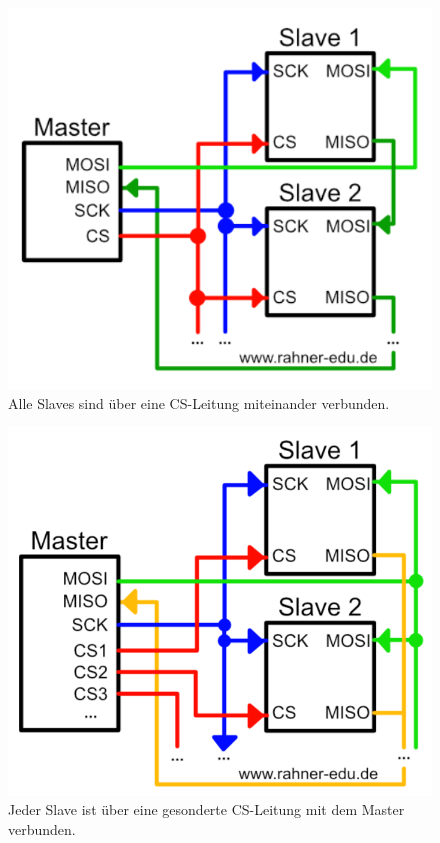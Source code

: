 \begin{figure}[H]
	\begin{center}
		\includegraphics[scale=0.45]{figures/hcis/spi_anschluss_1.png}
		\caption{Alle Slaves sind über eine CS-Leitung miteinander verbunden.}
		\label{abb:SPI_Anschluss_1}
	\end{center}
\end{figure}

\begin{figure}[H]
	\begin{center}	
		\includegraphics[scale=0.35]{figures/hcis/spi_anschluss_2.png}
		\caption{ Jeder Slave ist über eine gesonderte CS-Leitung mit dem Master verbunden.}
		\label{abb:SPI_Anschluss_2}
	\end{center}
\end{figure}

